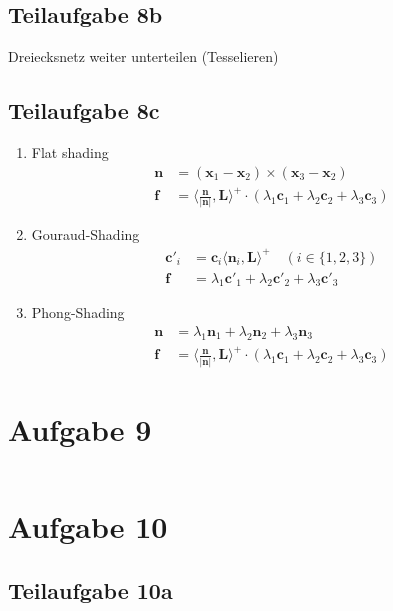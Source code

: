 \documentclass[a4paper]{scrartcl}
\begin{document}
\subsection*{Teilaufgabe 8b}
Dreiecksnetz weiter unterteilen (Tesselieren)
\subsection*{Teilaufgabe 8c}

\begin{enumerate}[label=(\roman*)]
    \item Flat shading
        \begin{align}
        \mathbf{n} &= (\mathbf{x}_1 - \mathbf{x}_2) \times (\mathbf{x}_3 - \mathbf{x}_2)\\
        \mathbf{f} &= \langle \tfrac{\mathbf{n}}{|\mathbf{n}|} , \mathbf{L} \rangle^+ \cdot (\lambda_1 \mathbf{c}_1 + \lambda_2 \mathbf{c}_2 + \lambda_3 \mathbf{c}_3)
        \end{align}
    \item Gouraud-Shading
        \begin{align}
        \mathbf{c}'_i &= \mathbf{c}_i \langle \mathbf{n}_i, \mathbf{L} \rangle^+ \quad (i \in \{1, 2, 3\})\\
        \mathbf{f} &= \lambda_1 \mathbf{c}'_1 + \lambda_2 \mathbf{c}'_2 + \lambda_3 \mathbf{c}'_3
        \end{align}
    \item Phong-Shading
        \begin{align}
        \mathbf{n} &= \lambda_1 \mathbf{n}_1 + \lambda_2 \mathbf{n}_2 + \lambda_3 \mathbf{n}_3\\
        \mathbf{f} &= \langle \tfrac{\mathbf{n}}{|\mathbf{n}|} , \mathbf{L} \rangle^+ \cdot (\lambda_1 \mathbf{c}_1 + \lambda_2 \mathbf{c}_2 + \lambda_3 \mathbf{c}_3)
        \end{align}
\end{enumerate}

\section*{Aufgabe 9}
\inputminted[linenos, numbersep=5pt, tabsize=4, frame=lines, label=keyframing.vert]{glsl}{keyframing.vert}

\section*{Aufgabe 10}
\subsection*{Teilaufgabe 10a}
\inputminted[linenos, numbersep=5pt, tabsize=4, frame=lines, label=shader.frag]{glsl}{shader.frag}
\end{document}
